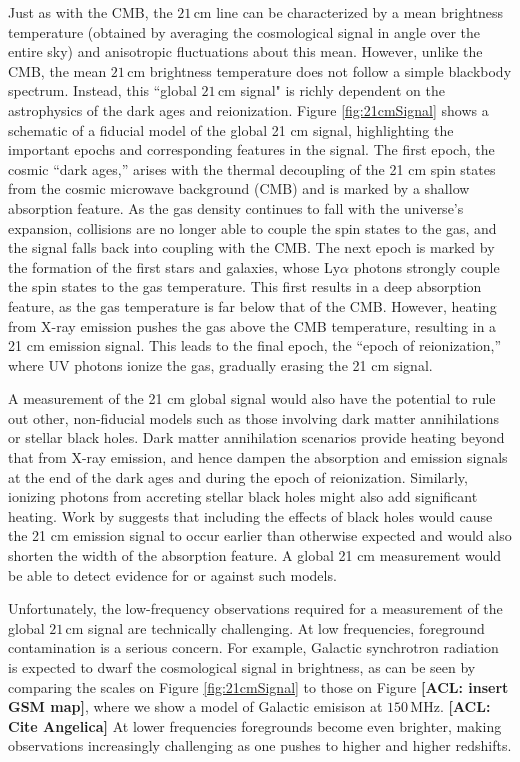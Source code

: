 \documentclass[twolcolumn,apj,iop,numberedappendix]{emulateapj}
\newcommand{\acl}[1]{{\color{red} \textbf{[ACL:  #1]}}}
\begin{document}
Just as with the CMB, the $21\,\textrm{cm}$ line can be characterized by a mean brightness temperature (obtained by averaging the cosmological signal in angle over the entire sky) and anisotropic fluctuations about this mean. However, unlike the CMB, the mean $21\,\textrm{cm}$ brightness temperature does not follow a simple blackbody spectrum. Instead, this ``global $21\,\textrm{cm}$ signal" is richly dependent on the astrophysics of the dark ages and reionization. Figure \ref{fig:21cmSignal} shows a schematic of a fiducial model of the global 21 cm signal, highlighting the important epochs and corresponding features in the signal. The first epoch, the cosmic ``dark ages,'' arises with the thermal decoupling of the 21 cm spin states from the cosmic microwave background (CMB) and is marked by a shallow absorption feature. As the gas density continues to fall with the universe's expansion, collisions are no longer able to couple the spin states to the gas, and the signal falls back into coupling with the CMB. The next epoch is marked by the formation of the first stars and galaxies, whose Ly$\alpha$ photons strongly couple the spin states to the gas temperature. This first results in a deep absorption feature, as the gas temperature is far below that of the CMB. However, heating from X-ray emission pushes the gas above the CMB temperature, resulting in a 21 cm emission signal. This leads to the final epoch, the ``epoch of reionization,'' where UV photons ionize the gas, gradually erasing the 21 cm signal.

A measurement of the 21 cm global signal would also have the potential to rule out other, non-fiducial models such as those involving dark matter annihilations or stellar black holes. Dark matter annihilation scenarios provide heating beyond that from X-ray emission, and hence dampen the absorption and emission signals at the end of the dark ages and during the epoch of reionization. \citep{Valdes2013_DM} Similarly, ionizing photons from accreting stellar black holes might also add significant heating. Work by \citet{Mirabel_stellar_bh} suggests that including the effects of black holes would cause the 21 cm emission signal to occur earlier than otherwise expected and would also shorten the width of the absorption feature. A global 21 cm measurement would be able to detect evidence for or against such models.

Unfortunately, the low-frequency observations required for a measurement of the global $21\,\textrm{cm}$ signal are technically challenging. At low frequencies, foreground contamination is a serious concern. For example, Galactic synchrotron radiation is expected to dwarf the cosmological signal in brightness, as can be seen by comparing the scales on Figure \ref{fig:21cmSignal} to those on Figure \acl{insert GSM map}, where we show a model of Galactic emisison at $150\,\textrm{MHz}$. \acl{Cite Angelica} At lower frequencies foregrounds become even brighter, making observations increasingly challenging as one pushes to higher and higher redshifts. 
\end{document}
